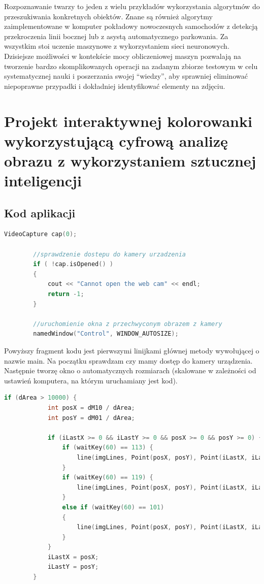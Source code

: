 \documentclass{article}
\begin{document}
	\par
	Rozpoznawanie twarzy to jeden z wielu przykładów wykorzystania algorytmów do przeszukiwania konkretnych obiektów. Znane są również algorytmy zaimplementowane w komputer pokładowy nowoczesnych samochodów z detekcją przekroczenia linii bocznej lub z asystą automatycznego parkowania. Za wszystkim stoi uczenie maszynowe z wykorzystaniem sieci neuronowych. Dzisiejsze możliwości w kontekście mocy obliczeniowej maszyn pozwalają na tworzenie bardzo skomplikowanych operacji na zadanym zbiorze testowym w celu systematycznej nauki i poszerzania swojej “wiedzy”, aby sprawniej eliminować niepoprawne przypadki i dokładniej identyfikować elementy na zdjęciu.
	
	\section{Projekt interaktywnej kolorowanki wykorzystującą cyfrową \linebreak analizę obrazu z wykorzystaniem sztucznej inteligencji}
	
	\subsection{Kod aplikacji}
	
	\begin{lstlisting}[language=C++, caption=Początek wywołania. Źródło: Własne]
		VideoCapture cap(0);
		
		//sprawdzenie dostepu do kamery urzadzenia
		if ( !cap.isOpened() )
		{
			cout << "Cannot open the web cam" << endl;
			return -1;
		}
		
		//uruchomienie okna z przechwyconym obrazem z kamery
		namedWindow("Control", WINDOW_AUTOSIZE);
	\end{lstlisting}
	
	Powyższy fragment kodu jest pierwszymi linijkami głównej metody wywołującej o nazwie main. Na początku sprawdzam czy mamy dostęp do kamery urządzenia. Następnie tworzę okno o automatycznych rozmiarach (skalowane w zależności od ustawień komputera, na którym uruchamiany jest kod).
	
	\newpage
	
	\begin{lstlisting}[language=C++, caption=Klawisze funkcyjne. Źródło: Własne]
		if (dArea > 10000) {
			int posX = dM10 / dArea;
			int posY = dM01 / dArea;        
			
			if (iLastX >= 0 && iLastY >= 0 && posX >= 0 && posY >= 0) {
				if (waitKey(60) == 113) {
					line(imgLines, Point(posX, posY), Point(iLastX, iLastY), Scalar(0,0,255), 15);
				}
				if (waitKey(60) == 119) {
					line(imgLines, Point(posX, posY), Point(iLastX, iLastY), Scalar(0,255,0), 15); 
				}
				else if (waitKey(60) == 101)
				{
					line(imgLines, Point(posX, posY), Point(iLastX, iLastY), Scalar(0,0,0), 15); 
				}
			}
			iLastX = posX;
			iLastY = posY;
		}
	\end{lstlisting}
\end{document}
